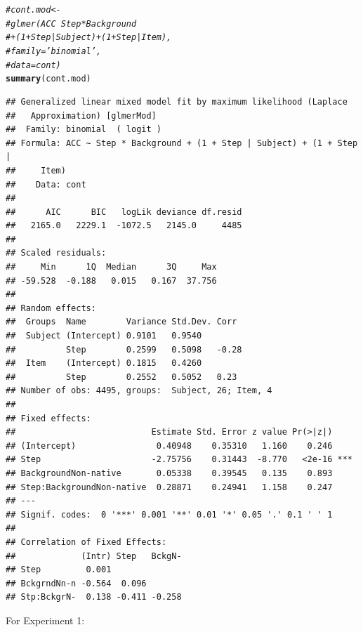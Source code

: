 \documentclass[11pt]{article}\usepackage[]{graphicx}\usepackage[]{color}
\makeatletter
\newcommand{\hlcom}[1]{\textcolor[rgb]{0.678,0.584,0.686}{\textit{#1}}}%
\newcommand{\hlstd}[1]{\textcolor[rgb]{0.345,0.345,0.345}{#1}}%
\newcommand{\hlkwd}[1]{\textcolor[rgb]{0.737,0.353,0.396}{\textbf{#1}}}%
\newenvironment{kframe}{%
 \def\at@end@of@kframe{}%
 \ifinner\ifhmode%
  \def\at@end@of@kframe{\end{minipage}}%
  \begin{minipage}{\columnwidth}%
 \fi\fi%
 \def\FrameCommand##1{\hskip\@totalleftmargin \hskip-\fboxsep
 \colorbox{shadecolor}{##1}\hskip-\fboxsep
     \hskip-\linewidth \hskip-\@totalleftmargin \hskip\columnwidth}%
 \MakeFramed {\advance\hsize-\width
   \@totalleftmargin\z@ \linewidth\hsize
   \@setminipage}}%
 {\par\unskip\endMakeFramed%
 \at@end@of@kframe}
\newenvironment{knitrout}{}{} %
\makeatother
\begin{document}
\begin{knitrout}\footnotesize
{}\color{fgcolor}\begin{kframe}
\begin{alltt}
 \hlcom{#cont.mod <- }
 \hlcom{#glmer(ACC ~ Step*Background}
 \hlcom{#+ (1+Step|Subject) + (1+Step|Item),}
 \hlcom{#family = 'binomial',}
 \hlcom{#data = cont)}
 \hlkwd{summary}\hlstd{(cont.mod)}
\end{alltt}
\begin{verbatim}
## Generalized linear mixed model fit by maximum likelihood (Laplace
##   Approximation) [glmerMod]
##  Family: binomial  ( logit )
## Formula: ACC ~ Step * Background + (1 + Step | Subject) + (1 + Step |  
##     Item)
##    Data: cont
## 
##      AIC      BIC   logLik deviance df.resid 
##   2165.0   2229.1  -1072.5   2145.0     4485 
## 
## Scaled residuals: 
##     Min      1Q  Median      3Q     Max 
## -59.528  -0.188   0.015   0.167  37.756 
## 
## Random effects:
##  Groups  Name        Variance Std.Dev. Corr 
##  Subject (Intercept) 0.9101   0.9540        
##          Step        0.2599   0.5098   -0.28
##  Item    (Intercept) 0.1815   0.4260        
##          Step        0.2552   0.5052   0.23 
## Number of obs: 4495, groups:  Subject, 26; Item, 4
## 
## Fixed effects:
##                           Estimate Std. Error z value Pr(>|z|)    
## (Intercept)                0.40948    0.35310   1.160    0.246    
## Step                      -2.75756    0.31443  -8.770   <2e-16 ***
## BackgroundNon-native       0.05338    0.39545   0.135    0.893    
## Step:BackgroundNon-native  0.28871    0.24941   1.158    0.247    
## ---
## Signif. codes:  0 '***' 0.001 '**' 0.01 '*' 0.05 '.' 0.1 ' ' 1
## 
## Correlation of Fixed Effects:
##             (Intr) Step   BckgN-
## Step         0.001              
## BckgrndNn-n -0.564  0.096       
## Stp:BckgrN-  0.138 -0.411 -0.258
\end{verbatim}
\end{kframe}
\end{knitrout}

For Experiment 1:
\end{document}
